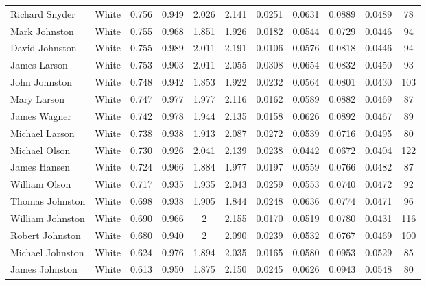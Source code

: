\documentclass[]{article}
\begin{document}
\begin{tabular}{lcccccccccc}
Richard Snyder & White & 0.756 & 0.949 & 2.026 & 2.141 & 0.0251 & 0.0631 & 0.0889 & 0.0489 & 78 \\
Mark Johnston & White & 0.755 & 0.968 & 1.851 & 1.926 & 0.0182 & 0.0544 & 0.0729 & 0.0446 & 94 \\
David Johnston & White & 0.755 & 0.989 & 2.011 & 2.191 & 0.0106 & 0.0576 & 0.0818 & 0.0446 & 94 \\
James Larson & White & 0.753 & 0.903 & 2.011 & 2.055 & 0.0308 & 0.0654 & 0.0832 & 0.0450 & 93 \\
John Johnston & White & 0.748 & 0.942 & 1.853 & 1.922 & 0.0232 & 0.0564 & 0.0801 & 0.0430 & 103 \\
Mary Larson & White & 0.747 & 0.977 & 1.977 & 2.116 & 0.0162 & 0.0589 & 0.0882 & 0.0469 & 87 \\
James Wagner & White & 0.742 & 0.978 & 1.944 & 2.135 & 0.0158 & 0.0626 & 0.0892 & 0.0467 & 89 \\
Michael Larson & White & 0.738 & 0.938 & 1.913 & 2.087 & 0.0272 & 0.0539 & 0.0716 & 0.0495 & 80 \\
Michael Olson & White & 0.730 & 0.926 & 2.041 & 2.139 & 0.0238 & 0.0442 & 0.0672 & 0.0404 & 122 \\
James Hansen & White & 0.724 & 0.966 & 1.884 & 1.977 & 0.0197 & 0.0559 & 0.0766 & 0.0482 & 87 \\
William Olson & White & 0.717 & 0.935 & 1.935 & 2.043 & 0.0259 & 0.0553 & 0.0740 & 0.0472 & 92 \\
Thomas Johnston & White & 0.698 & 0.938 & 1.905 & 1.844 & 0.0248 & 0.0636 & 0.0774 & 0.0471 & 96 \\
William Johnston & White & 0.690 & 0.966 & 2 & 2.155 & 0.0170 & 0.0519 & 0.0780 & 0.0431 & 116 \\
Robert Johnston & White & 0.680 & 0.940 & 2 & 2.090 & 0.0239 & 0.0532 & 0.0767 & 0.0469 & 100 \\
Michael Johnston & White & 0.624 & 0.976 & 1.894 & 2.035 & 0.0165 & 0.0580 & 0.0953 & 0.0529 & 85 \\
 James Johnston & White & 0.613 & 0.950 & 1.875 & 2.150 & 0.0245 & 0.0626 & 0.0943 & 0.0548 & 80 \\ \hline
\end{tabular}
\end{document}
